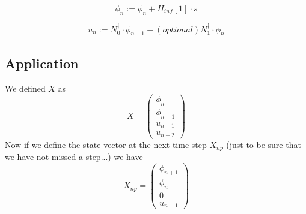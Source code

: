 \documentclass[a4,10pt]{article}
\begin{document}
\begin{equation}
\phi_n := \phi_n + H_{inf}[1] \cdot s
\end{equation}

\begin{equation}
u_{n} := N^{\dag}_0 \cdot \phi_{n+1} + (optional)N^{\dag}_1\cdot \phi_{n}
\label{eq:ur}
\end{equation}


\subsection{Application}

We defined $X$ as
\begin{equation*}
X=\begin{pmatrix}
\phi_n\\
\phi_{n-1}\\
u_{n-1}\\
u_{n-2}\end{pmatrix}
\end{equation*}
Now if we define the state vector at the next time step $X_{np}$ (just to be sure that we have not missed a step...) we have
\begin{equation*}
X_{np}=\begin{pmatrix}
\phi_{n+1}\\
\phi_{n}\\
0\\
u_{n-1}\end{pmatrix}
\end{equation*}
\end{document}
